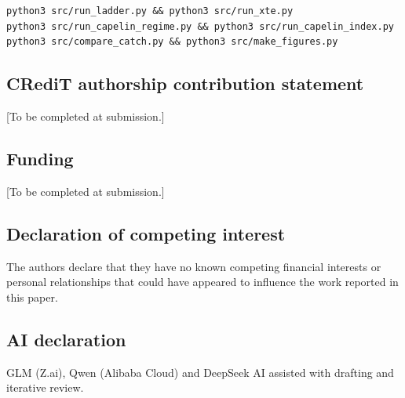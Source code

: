\documentclass[11pt]{article}
\begin{document}
\begin{verbatim}
python3 src/run_ladder.py && python3 src/run_xte.py
python3 src/run_capelin_regime.py && python3 src/run_capelin_index.py
python3 src/compare_catch.py && python3 src/make_figures.py
\end{verbatim}

\subsection*{CRediT authorship contribution statement}

{[}To be completed at submission.{]}

\subsection*{Funding}

{[}To be completed at submission.{]}

\subsection*{Declaration of competing interest}

The authors declare that they have no known competing financial
interests or personal relationships that could have appeared to
influence the work reported in this paper.

\subsection*{AI declaration}
GLM (Z.ai), Qwen (Alibaba Cloud) and DeepSeek AI assisted with drafting and iterative review.
\end{document}
